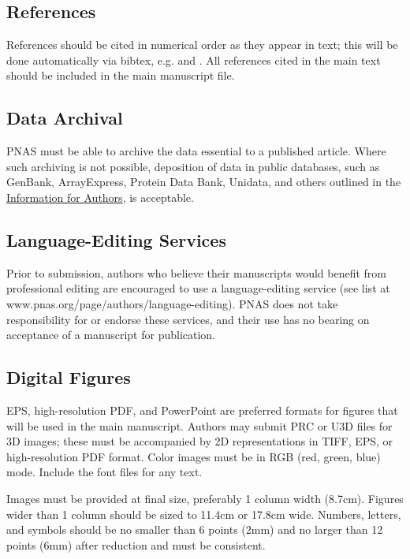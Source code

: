 \documentclass[9pt,twocolumn,twoside,lineno]{pnas-new}
\begin{document}
\subsection*{References}

References should be cited in numerical order as they appear in text; this will be done automatically via bibtex, e.g. \cite{belkin2002using} and \cite{berard1994embedding,coifman2005geometric}. All references cited in the main text should be included in the main manuscript file.

\subsection*{Data Archival}

PNAS must be able to archive the data essential to a published article. Where such archiving is not possible, deposition of data in public databases, such as GenBank, ArrayExpress, Protein Data Bank, Unidata, and others outlined in the \href{https://www.pnas.org/page/authors/journal-policies#xi}{Information for Authors}, is acceptable.

\subsection*{Language-Editing Services}
Prior to submission, authors who believe their manuscripts would benefit from professional editing are encouraged to use a language-editing service (see list at www.pnas.org/page/authors/language-editing). PNAS does not take responsibility for or endorse these services, and their use has no bearing on acceptance of a manuscript for publication. 

\subsection*{Digital Figures}

EPS, high-resolution PDF, and PowerPoint are preferred formats for figures that will be used in the main manuscript. Authors may submit PRC or U3D files for 3D images; these must be accompanied by 2D representations in TIFF, EPS, or high-resolution PDF format. Color images must be in RGB (red, green, blue) mode. Include the font files for any text.

Images must be provided at final size, preferably 1 column width (8.7cm). Figures wider than 1 column should be sized to 11.4cm or 17.8cm wide. Numbers, letters, and symbols should be no smaller than 6 points (2mm) and no larger than 12 points (6mm) after reduction and must be consistent. 
\end{document}
